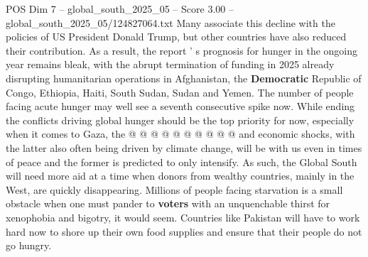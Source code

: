 \begin{textsample}{POS Dim 7 – global\_south\_2025\_05 – Score 3.00 – global\_south\_2025\_05/124827064.txt}
Many associate this decline with the policies of US President Donald Trump, but other countries have also reduced their contribution.
As a result, the report ' s prognosis for hunger in the ongoing year remains bleak, with the abrupt termination of funding in 2025 already disrupting humanitarian operations in Afghanistan, the \textbf{Democratic} Republic of Congo, Ethiopia, Haiti, South Sudan, Sudan and Yemen.
The number of people facing acute hunger may well see a seventh consecutive spike now.
While ending the conflicts driving global hunger should be the top priority for now, especially when it comes to Gaza, the @ @ @ @ @ @ @ @ @ @ and economic shocks, with the latter also often being driven by climate change, will be with us even in times of peace and the former is predicted to only intensify.
As such, the Global South will need more aid at a time when donors from wealthy countries, mainly in the West, are quickly disappearing.
Millions of people facing starvation is a small obstacle when one must pander to \textbf{voters} with an unquenchable thirst for xenophobia and bigotry, it would seem.
Countries like Pakistan will have to work hard now to shore up their own food supplies and ensure that their people do not go hungry.

\end{textsample}

